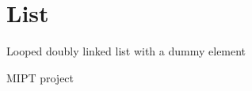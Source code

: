 \chapter{List}
\hypertarget{index}{}\label{index}
\label{index_md__r_e_a_d_m_e}%
%
 Looped doubly linked list with a dummy element

MIPT project 